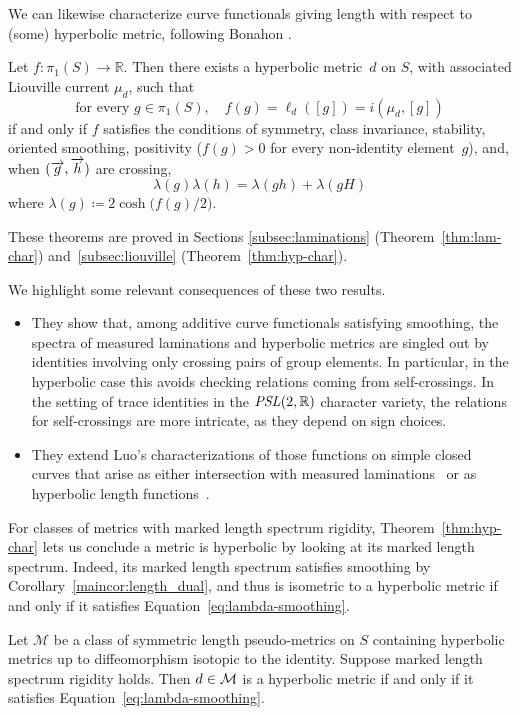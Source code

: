 We can likewise characterize curve functionals giving length with respect to
(some) hyperbolic metric, following Bonahon \cite[Theorem~13]{Bonahon88:GeodesicCurrent}.
\begin{mainthm}
\label{thm:hyp-char}
Let $f \colon \pi_1(S) \to \mathbb{R}$.
Then there exists a  hyperbolic metric~$d$
on $S$, with associated Liouville current $\mu_d$, such that
\[
\text{for every } g\in \pi_1(S),\quad
f(g) = \ell_d([g]) = i(\mu_d,[g])
\]
if and only if $f$ satisfies the conditions of symmetry, class invariance,
stability, oriented smoothing,
positivity ($f(g) > 0$ for every non-identity element~$g$),
and, when $(\overrightarrow{g},\overrightarrow{h})$ are crossing,
\begin{equation}\label{eq:lambda-smoothing}
\lambda(g)\lambda(h)
  = \lambda(gh)+\lambda(gH)
\end{equation}
where $\lambda(g)\coloneqq 2\cosh\!\bigl(f(g)/2\bigr)$.
\end{mainthm}


These theorems are proved in Sections \ref{subsec:laminations}
(Theorem~\ref{thm:lam-char}) and~\ref{subsec:liouville}
(Theorem~\ref{thm:hyp-char}).

We highlight some relevant consequences of these two results.

\begin{itemize}
\item They show that, among additive curve functionals satisfying smoothing, the spectra of measured laminations and hyperbolic metrics are singled out by identities involving only crossing pairs of group elements. In particular, in the
    hyperbolic case this avoids checking relations coming from
    self-crossings. In the setting of trace identities in the
    $\operatorname{\mathit{PSL}}(2,\mathbb{R})$ character variety, the relations for
    self-crossings are more intricate, as they depend on sign choices.
    \item They extend Luo’s characterizations of those
functions on simple closed curves that arise as either intersection with
measured laminations~\cite[Theorem~1.1, Theorem~1.2]{Luo10:Simple}
or as hyperbolic length
functions~\cite{Luo98:GeodesicLength}.
\end{itemize}
    For classes of metrics with marked length spectrum rigidity, Theorem~\ref{thm:hyp-char} lets us conclude a metric is
    hyperbolic by looking at its marked length spectrum. Indeed, its marked length spectrum satisfies smoothing by
Corollary~\ref{maincor:length_dual}, and thus is isometric to a
hyperbolic metric
if and only if it satisfies Equation~\eqref{eq:lambda-smoothing}. 
     \begin{maincor}\label{maincor:rigidity_hyperbolic} Let $\mathcal{M}$ be a class of symmetric length pseudo-metrics on $S$ containing hyperbolic metrics up to diffeomorphism isotopic to the identity. Suppose marked length
spectrum rigidity holds. Then $d \in \mathcal{M}$ is a hyperbolic metric if and only if it satisfies Equation~\eqref{eq:lambda-smoothing}.
\end{maincor}

